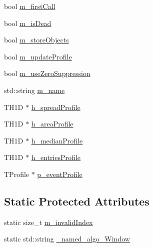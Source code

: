 \begin{DoxyCompactItemize}
\item 
bool \hyperlink{classSlidingWindow_1_1Window_af8a01fa818b69a4c3abe07e1f6c738c9}{m\+\_\+first\+Call}
\item 
bool \hyperlink{classSlidingWindow_1_1Window_a760dc31d2bafceaabcb58261d0766d63}{m\+\_\+is\+Dead}
\item 
bool \hyperlink{classSlidingWindow_1_1Window_a70c04eb01ffc3d64680c11d0e0b2c4e8}{m\+\_\+store\+Objects}
\item 
bool \hyperlink{classSlidingWindow_1_1Window_abc51f8686319ba77efe62878ebf8bb8e}{m\+\_\+update\+Profile}
\item 
bool \hyperlink{classSlidingWindow_1_1Window_a07c0d538384a9a35d5bfb2b341f41fae}{m\+\_\+use\+Zero\+Suppression}
\item 
std\+::string \hyperlink{classSlidingWindow_1_1Window_a91d8a34cff48db9b83909c8d3ea8320a}{m\+\_\+name}
\item 
T\+H1D $\ast$ \hyperlink{classSlidingWindow_1_1Window_a6b488ac4c3f0f5d0562479df27e31dbd}{h\+\_\+spread\+Profile}
\item 
T\+H1D $\ast$ \hyperlink{classSlidingWindow_1_1Window_a64de3976873889730213091ea196eee9}{h\+\_\+area\+Profile}
\item 
T\+H1D $\ast$ \hyperlink{classSlidingWindow_1_1Window_abe926d32bb55044c3ab6ae69d6ed7503}{h\+\_\+median\+Profile}
\item 
T\+H1D $\ast$ \hyperlink{classSlidingWindow_1_1Window_af23a441ea30a49948e3d3a77ac921127}{h\+\_\+entries\+Profile}
\item 
T\+Profile $\ast$ \hyperlink{classSlidingWindow_1_1Window_abd3e78a58ed38aaefef14afd2a27e448}{p\+\_\+event\+Profile}
\end{DoxyCompactItemize}
\subsection*{Static Protected Attributes}
\begin{DoxyCompactItemize}
\item 
static size\+\_\+t \hyperlink{classSlidingWindow_1_1Window_a9e500dcaf7c2a18fd5a2e8f1775704c2}{m\+\_\+invalid\+Index}
\item 
static std\+::string \hyperlink{classSlidingWindow_1_1Window_a963bd3e616c1936117625416b97775b2}{\+\_\+named\+\_\+algo\+\_\+\+Window}
\end{DoxyCompactItemize}
